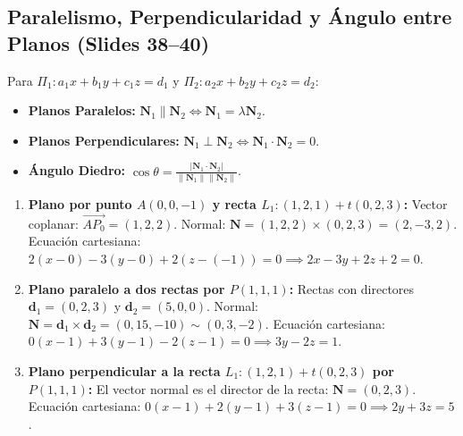 \documentclass[10pt,letterpaper]{article}
\newcommand{\vn}{\mathbf{N}}
\begin{document}
\subsection{Paralelismo, Perpendicularidad y Ángulo entre Planos (Slides 38--40)}
Para $\Pi_1: a_1 x + b_1 y + c_1 z = d_1$ y $\Pi_2: a_2 x + b_2 y + c_2 z = d_2$:
\begin{itemize}
    \item \textbf{Planos Paralelos:} $\vn_1 \parallel \vn_2 \iff \vn_1 = \lambda\vn_2$.
    \item \textbf{Planos Perpendiculares:} $\vn_1 \perp \vn_2 \iff \vn_1 \cdot \vn_2 = 0$.
    \item \textbf{Ángulo Diedro:} $\cos\theta = \frac{|\vn_1 \cdot \vn_2|}{\|\vn_1\|\|\vn_2\|}$.
\end{itemize}

\begin{cajaEjemplo}
\begin{enumerate}
    \item \textbf{Plano por punto $A(0, 0, -1)$ y recta $L_1: (1, 2, 1) + t(0, 2, 3)$:}
    Vector coplanar: $\overrightarrow{AP_0} = (1, 2, 2)$. Normal: $\vn = (1, 2, 2) \times (0, 2, 3) = (2, -3, 2)$.
    Ecuación cartesiana: $2(x - 0) - 3(y - 0) + 2(z - (-1)) = 0 \implies 2x - 3y + 2z + 2 = 0$.
    \item \textbf{Plano paralelo a dos rectas por $P(1, 1, 1)$:}
    Rectas con directores $\mathbf{d}_1 = (0, 2, 3)$ y $\mathbf{d}_2 = (5, 0, 0)$. Normal: $\vn = \mathbf{d}_1 \times \mathbf{d}_2 = (0, 15, -10) \sim (0, 3, -2)$.
    Ecuación cartesiana: $0(x - 1) + 3(y - 1) - 2(z - 1) = 0 \implies 3y - 2z = 1$.
    \item \textbf{Plano perpendicular a la recta $L_1: (1, 2, 1) + t(0, 2, 3)$ por $P(1, 1, 1)$:}
    El vector normal es el director de la recta: $\vn = (0, 2, 3)$.
    Ecuación cartesiana: $0(x - 1) + 2(y - 1) + 3(z - 1) = 0 \implies 2y + 3z = 5$.
\end{enumerate}
\end{cajaEjemplo}
\end{document}
